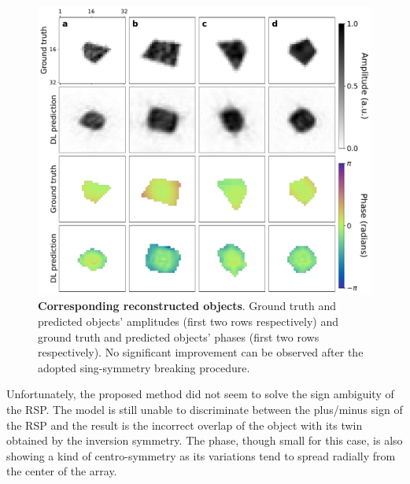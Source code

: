 \begin{figure}[H]
    \centering
    \includegraphics[width=.8\textwidth]{figures/Phasing/obj_low_strain_doubleMSE_symmJuSun.pdf}
    \caption{\textbf{Corresponding reconstructed objects}. Ground truth and predicted objects' amplitudes (first two rows 
    respectively) and ground truth and predicted objects' phases (first two rows respectively). No significant improvement 
    can be observed after the adopted sing-symmetry breaking procedure.}
    \label{fig:obj_lowStrain_doubleMSE_JuSun}
\end{figure}

Unfortunately, the proposed method did not seem to solve the sign ambiguity of the RSP. The model is still unable to 
discriminate between the plus/minus sign of the RSP and the result is the incorrect overlap of the object with its twin
obtained by the inversion symmetry. The phase, though small for this case, is also showing a kind of centro-symmetry 
as its variations tend to spread radially from the center of the array. 

